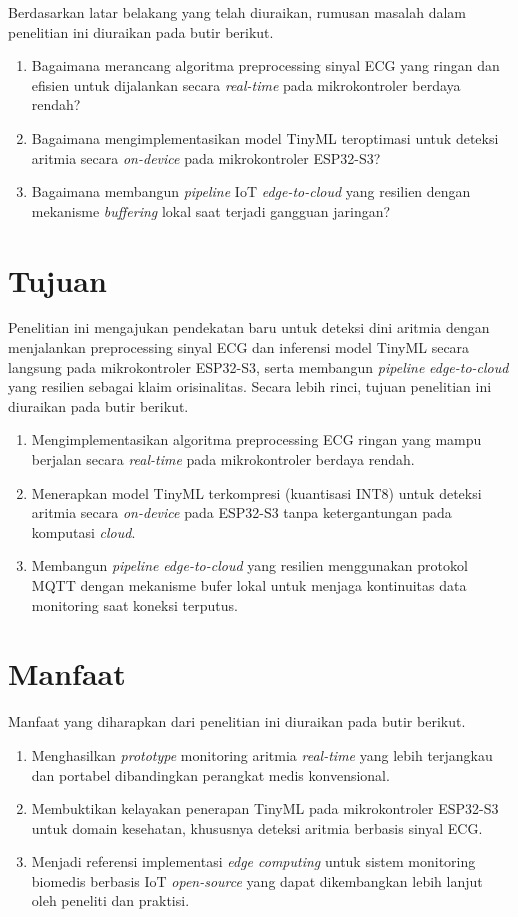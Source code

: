 Berdasarkan latar belakang yang telah diuraikan, rumusan masalah dalam penelitian ini diuraikan pada butir berikut.
\begin{enumerate}
  \item Bagaimana merancang algoritma preprocessing sinyal ECG yang ringan dan efisien untuk dijalankan secara \textit{real-time} pada mikrokontroler berdaya rendah?
  \item Bagaimana mengimplementasikan model TinyML teroptimasi untuk deteksi aritmia secara \textit{on-device} pada mikrokontroler ESP32-S3?
  \item Bagaimana membangun \textit{pipeline} IoT \textit{edge-to-cloud} yang resilien dengan mekanisme \textit{buffering} lokal saat terjadi gangguan jaringan?
\end{enumerate}

\section{Tujuan}

Penelitian ini mengajukan pendekatan baru untuk deteksi dini aritmia dengan menjalankan preprocessing sinyal ECG dan inferensi model TinyML secara langsung pada mikrokontroler ESP32-S3, serta membangun \textit{pipeline} \textit{edge-to-cloud} yang resilien sebagai klaim orisinalitas. Secara lebih rinci, tujuan penelitian ini diuraikan pada butir berikut.
\begin{enumerate}
  \item Mengimplementasikan algoritma preprocessing ECG ringan yang mampu berjalan secara \textit{real-time} pada mikrokontroler berdaya rendah.
  \item Menerapkan model TinyML terkompresi (kuantisasi INT8) untuk deteksi aritmia secara \textit{on-device} pada ESP32-S3 tanpa ketergantungan pada komputasi \textit{cloud}.
  \item Membangun \textit{pipeline} \textit{edge-to-cloud} yang resilien menggunakan protokol MQTT dengan mekanisme bufer lokal untuk menjaga kontinuitas data monitoring saat koneksi terputus.
\end{enumerate}

\section{Manfaat}

Manfaat yang diharapkan dari penelitian ini diuraikan pada butir berikut.
\begin{enumerate}
  \item Menghasilkan \emph{prototype} monitoring aritmia \textit{real-time} yang lebih terjangkau dan portabel dibandingkan perangkat medis konvensional.
  \item Membuktikan kelayakan penerapan TinyML pada mikrokontroler ESP32-S3 untuk domain kesehatan, khususnya deteksi aritmia berbasis sinyal ECG.
  \item Menjadi referensi implementasi \textit{edge computing} untuk sistem monitoring biomedis berbasis IoT \textit{open-source} yang dapat dikembangkan lebih lanjut oleh peneliti dan praktisi.
\end{enumerate}

